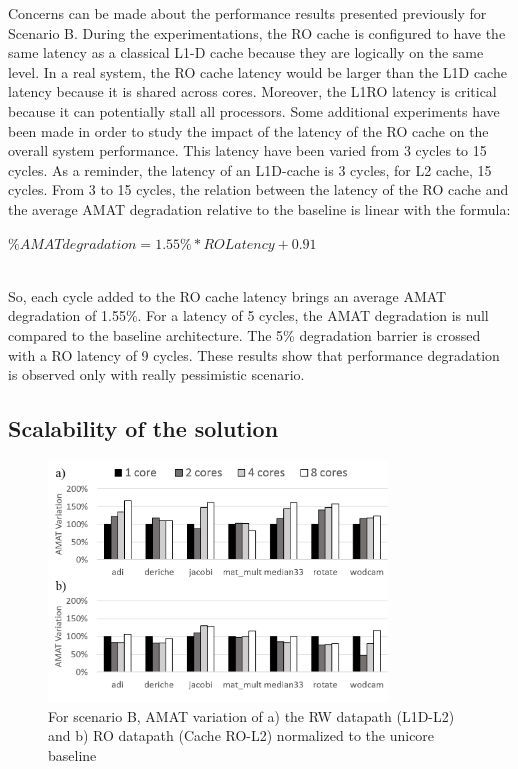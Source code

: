 \documentclass[sigconf]{acmart}
\begin{document}
Concerns can be made about the performance results presented
previously for Scenario B. During the experimentations, the RO cache
is configured to have the same latency as a classical L1-D cache
because they are logically on the same level. In a real system, the RO
cache latency would be larger than the L1D cache latency because it is
shared across cores. Moreover, the L1RO latency is critical because it can potentially stall all
processors. Some additional experiments have been made in
order to study the impact of the latency of the RO cache on the
overall system performance. This latency have been varied from 3
cycles to 15 cycles. As a reminder, the latency of an L1D-cache is 3
cycles, for L2 cache, 15 cycles. From 3 to 15 cycles, the relation
between the latency of the RO cache and the average AMAT degradation
relative to the baseline is linear with the formula:
\centerline{$\%AMATdegradation = 1.55\% * ROLatency +0.91$}\\
So, each cycle added to the RO cache latency brings an average AMAT
degradation of 1.55\%. For a latency of 5 cycles, the AMAT degradation
is null compared to the baseline architecture. The 5\% degradation
barrier is crossed with a RO latency of 9 cycles. These results show
that performance degradation is observed only with really pessimistic
scenario.

\subsection{Scalability of the solution}
\begin{figure}
    \centering
    \includegraphics[width=9cm]{./images/scalabilityAMAT.png}
    \caption{For scenario B, AMAT variation of a) the RW datapath (L1D-L2) and b) RO datapath (Cache RO-L2) normalized to the unicore baseline}
    \label{amatVariation}
\end{figure}
\end{document}
